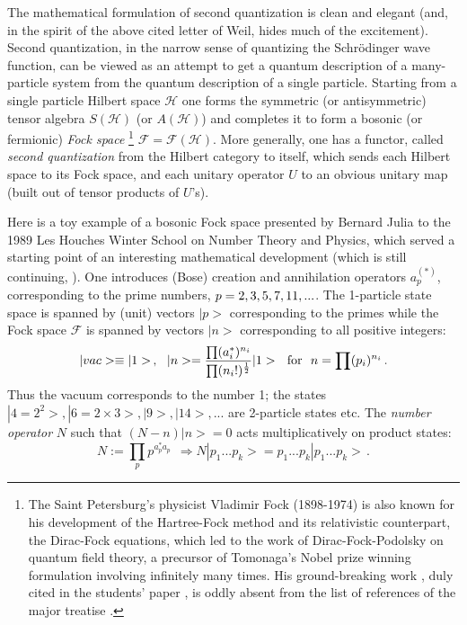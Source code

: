 The mathematical formulation of second quantization is clean and elegant (and, 
in the spirit of the above cited letter of Weil, hides much of the excitement).
 Second quantization, in the narrow sense of quantizing the Schr\"odinger wave 
function, can be viewed as an attempt to get a quantum description of a 
many-particle system from the quantum description of a single particle. Starting
 from a single particle Hilbert space $\mathcal{H}$ one forms the symmetric (or
 antisymmetric) tensor algebra $S(\mathcal{H})$ (or $A(\mathcal{H})$) and 
completes it to form a bosonic (or fermionic) {\it Fock space} \footnote{The 
Saint Petersburg's physicist Vladimir Fock (1898-1974) is also known for his 
development of the Hartree-Fock method and its relativistic counterpart, the 
Dirac-Fock equations, which led to the work of Dirac-Fock-Podolsky on quantum 
field theory, a precursor of Tomonaga's Nobel prize winning formulation 
involving infinitely many times. His ground-breaking work \cite{F32}, duly cited
 in the students' paper \cite{CF09}, is oddly absent from the list of references
 of the major treatise \cite{Sch}.} $\mathcal{F} = \mathcal{F}(\mathcal{H})$. 
More generally, one has a functor, called {\it second quantization} from the
Hilbert category to itself, which sends each Hilbert space to its Fock space, 
and each unitary operator $U$ to an obvious
unitary map (built out of tensor products of $U$'s).

Here is a toy example of a bosonic Fock space presented by Bernard Julia to the 1989 Les Houches Winter School on
Number Theory and Physics, which served a starting point of an interesting
mathematical development \cite{BC} (which is still continuing, \cite{CC}).
One introduces (Bose) creation and annihilation operators $a_p^{(*)}$, corresponding to the prime numbers, $p=2, 3, 5, \\
 7, 11, ...$. The 1-particle state space is spanned by (unit) vectors $|p>$ corresponding to the primes while the Fock 
space $\mathcal{F}$ is spanned by vectors $|n>$ corresponding to all positive integers:
\begin{equation}
\label{JBC}
|vac>\equiv |1>\,, \ \ |n> = \frac{\prod(a_i^*)^{n_i}}{\prod(n_i!)^{\frac{1}{2}}}
|1> \ \ {\rm for} \ \ n = \prod (p_i)^{n_i}\,.
\end{equation}
Thus the vacuum corresponds to the number 1; the states $|4=2^2>, |6=2\times 3>, |9>, |14>, ...$ are 2-particle states etc.
The {\it number operator} $N$ such that $(N-n)|n> = 0$ acts multiplicatively on product states:
\begin{equation}
\label{N}
N:= \prod_p p^{a^*_p a_p} \ \ \Rightarrow N|p_1...p_k> = p_1...p_k |p_1...p_k>\,.
\end{equation}

